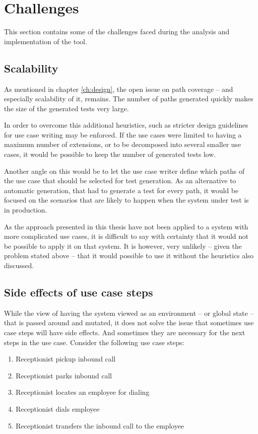 \section{Challenges}
This section contains some of the challenges faced during the analysis and implementation of the tool.
\subsection{Scalability}
\label{sec:scalability}
As mentioned in chapter \ref{ch:design}, the open issue on path coverage -- and especially scalability of it, remains. The number of paths generated quickly makes the size of the generated tests very large.\medskip

\noindent In order to overcome this additional heuristics, such as stricter design guidelines for use case writing may be enforced. If the use cases were limited to having a maximum number of extensions, or to be decomposed into several smaller use cases, it would be possible to keep the number of generated tests low.\medskip

\noindent Another angle on this would be to let the use case writer define which paths of the use case that should be selected for test generation. As an alternative to automatic generation, that had to generate a test for every path, it would be focused on the scenarios that are likely to happen when the system under test is in production.\medskip

\noindent As the approach presented in this thesis have not been applied to a system with more complicated use cases, it is difficult to say with certainty that it would not be possible to apply it on that system. It is however, very unlikely -- given the problem stated above -- that it would possible to use it without the heuristics also discussed.

\subsection{Side effects of use case steps}
While the view of having the system viewed as an environment -- or global state -- that is passed around and mutated, it does not solve the issue that sometimes use case steps will have side effects. And sometimes they are necessary for the next steps in the use case. Consider the following use case steps:

\begin{enumerate}
 \item Receptionist pickup inbound call
 \item Receptionist parks inbound call
 \item Receptionist locates an employee for dialing
 \item Receptionist dials employee
 \item Receptionist transfers the inbound call to the employee
\end{enumerate}

